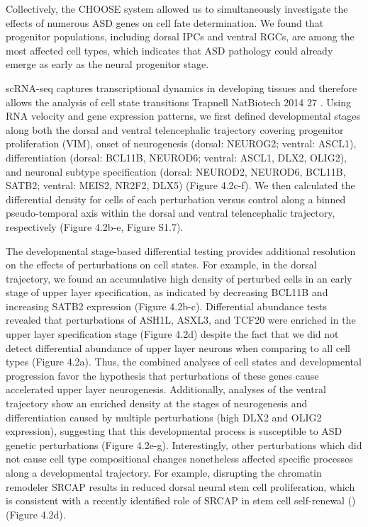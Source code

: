 Collectively, the CHOOSE system allowed us to simultaneously investigate the effects of numerous ASD genes on cell fate determination. We found that progenitor populations, including dorsal IPCs and ventral RGCs, are among the most affected cell types, which indicates that ASD pathology could already emerge as early as the neural progenitor stage.  


scRNA-seq captures transcriptional dynamics in developing tissues and therefore allows the analysis of cell state transitions {Trapnell NatBiotech 2014} 27 . Using RNA velocity and gene expression patterns, we first defined developmental stages along both the dorsal and ventral telencephalic trajectory covering progenitor proliferation (VIM), onset of neurogenesis (dorsal: NEUROG2; ventral: ASCL1), differentiation (dorsal: BCL11B, NEUROD6; ventral: ASCL1, DLX2, OLIG2), and neuronal subtype specification (dorsal: NEUROD2, NEUROD6, BCL11B, SATB2; ventral: MEIS2, NR2F2, DLX5) (Figure 4.2c-f). We then calculated the differential density for cells of each perturbation versus control along a binned pseudo-temporal axis within the dorsal and ventral telencephalic trajectory, respectively (Figure 4.2b-e, Figure S1.7). 

The developmental stage-based differential testing provides additional resolution on the effects of perturbations on cell states. For example, in the dorsal trajectory, we found an accumulative high density of perturbed cells in an early stage of upper layer specification, as indicated by decreasing BCL11B and increasing SATB2 expression (Figure 4.2b-c). Differential abundance tests revealed that perturbations of ASH1L, ASXL3, and TCF20 were enriched in the upper layer specification stage (Figure 4.2d) despite the fact that we did not detect differential abundance of upper layer neurons when comparing to all cell types (Figure 4.2a). Thus, the combined analyses of cell states and developmental progression favor the hypothesis that perturbations of these genes cause accelerated upper layer neurogenesis. Additionally, analyses of the ventral trajectory show an enriched density at the stages of neurogenesis and differentiation caused by multiple perturbations (high DLX2 and OLIG2 expression), suggesting that this developmental process is susceptible to ASD genetic perturbations (Figure 4.2e-g). Interestingly, other perturbations which did not cause cell type compositional changes nonetheless affected specific processes along a developmental trajectory. For example, disrupting the chromatin remodeler SRCAP results in reduced dorsal neural stem cell proliferation, which is consistent with a recently identified role of SRCAP in stem cell self-renewal (\cite{funayama_chchd2_2015})(Figure 4.2d). 

